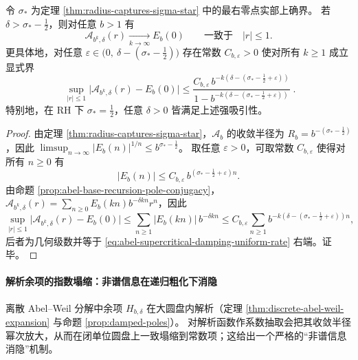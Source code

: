 \begin{proposition}\label{prop:abel-supercritical-damping-constant-attractor}
令 \(\sigma_*\) 为定理 \ref{thm:radius-captures-sigma-star} 中的最右零点实部上确界。
若 \(\delta>\sigma_*-\tfrac12\)，则对任意 \(b>1\) 有
\[
\mathcal A_{b^k,\delta}(r)\xrightarrow[k\to\infty]{}E_b(0)
\qquad\text{一致于}\quad |r|\le 1.
\]
更具体地，对任意
\(
\varepsilon\in\bigl(0,\ \delta-(\sigma_*-\tfrac12)\bigr)
\)
存在常数 \(C_{b,\varepsilon}>0\) 使对所有 \(k\ge 1\) 成立显式界
\begin{equation}\label{eq:abel-supercritical-damping-uniform-rate}
\boxed{\;
\sup_{|r|\le 1}\bigl|\mathcal A_{b^k,\delta}(r)-E_b(0)\bigr|
\le
\frac{C_{b,\varepsilon}\,b^{-k(\delta-(\sigma_*-\frac12+\varepsilon))}}{1-b^{-k(\delta-(\sigma_*-\frac12+\varepsilon))}}\; }.
\end{equation}
特别地，在 RH 下 \(\sigma_*=\tfrac12\)，任意 \(\delta>0\) 皆满足上述强吸引性。
\end{proposition}
\begin{proof}
由定理 \ref{thm:radius-captures-sigma-star}，\(\mathcal A_b\) 的收敛半径为 \(R_b=b^{-(\sigma_*-\frac12)}\)，因此
\(
\limsup_{n\to\infty}|E_b(n)|^{1/n}\le b^{\sigma_*-\frac12}
\)。
取任意 \(\varepsilon>0\)，可取常数 \(C_{b,\varepsilon}\) 使得对所有 \(n\ge 0\) 有
\[
|E_b(n)|\le C_{b,\varepsilon}\,b^{(\sigma_*-\frac12+\varepsilon)n}.
\]
由命题 \ref{prop:abel-base-recursion-pole-conjugacy}，\(\mathcal A_{b^k,\delta}(r)=\sum_{n\ge 0}E_b(kn)b^{-\delta kn}r^n\)，因此
\[
\sup_{|r|\le 1}\bigl|\mathcal A_{b^k,\delta}(r)-E_b(0)\bigr|
\le \sum_{n\ge 1}|E_b(kn)|\,b^{-\delta kn}
\le C_{b,\varepsilon}\sum_{n\ge 1}b^{-k(\delta-(\sigma_*-\frac12+\varepsilon))n},
\]
后者为几何级数并等于 \eqref{eq:abel-supercritical-damping-uniform-rate} 右端。证毕。
\end{proof}

\paragraph{解析余项的指数塌缩：非谱信息在递归粗化下消隐}
离散 Abel--Weil 分解中余项 \(H_{b,\delta}\) 在大圆盘内解析（定理 \ref{thm:discrete-abel-weil-expansion} 与命题 \ref{prop:damped-poles}）。
对解析函数作系数抽取会把其收敛半径幂次放大，从而在闭单位圆盘上一致塌缩到常数项；这给出一个严格的“非谱信息消隐”机制。


